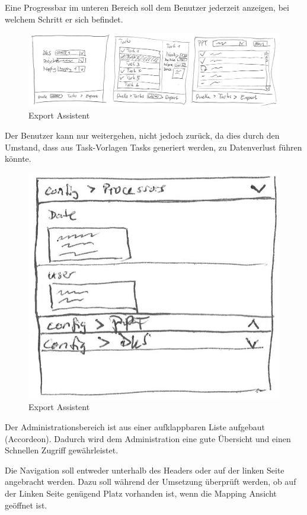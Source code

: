 	Eine Progressbar im unteren Bereich soll dem Benutzer jederzeit anzeigen, bei welchem Schritt er sich befindet.
	
	\begin{figure}[H]
		\includegraphics[width=\linewidth]{interfacesAndProtocols/media/img/exportWorkflow.jpg}
		\caption{Export Assistent}
		\label{fig:exportAssistent}
	\end{figure}	
	
	Der Benutzer kann nur weitergehen, nicht jedoch zurück, da dies durch den Umstand, 
	dass aus Task-Vorlagen Tasks generiert werden, 
	zu Datenverlust führen könnte.
	
	\begin{figure}[H]
		\centering
		\includegraphics[width=0.3\linewidth]{interfacesAndProtocols/media/img/administration.jpg}
		\caption{Export Assistent}
		\label{fig:administration}
	\end{figure}	
	
	Der Administrationsbereich ist aus einer aufklappbaren Liste aufgebaut (Accordeon). Dadurch wird dem Administration eine gute Übersicht und einen Schnellen Zugriff gewährleistet.
	
	Die Navigation soll entweder unterhalb des Headers oder auf der linken Seite angebracht werden. Dazu soll während der Umsetzung überprüft werden, ob auf der Linken Seite genügend Platz vorhanden ist, wenn die Mapping Ansicht geöffnet ist.